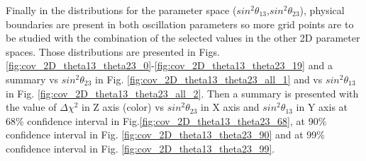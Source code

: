 Finally in the distributions for the parameter space ($sin^{2}\theta_{13}$,$sin^{2}\theta_{23}$),
physical boundaries are present in both oscillation parameters so more grid points are to be studied 
with the combination of the selected values in the other 2D parameter spaces. 
Those distributions are presented in Figs. \ref{fig:cov_2D_theta13_theta23_0}-\ref{fig:cov_2D_theta13_theta23_19}
and a summary vs $sin^{2}\theta_{23}$ in Fig. \ref{fig:cov_2D_theta13_theta23_all_1} and vs  $sin^{2}\theta_{13}$ in Fig. \ref{fig:cov_2D_theta13_theta23_all_2}. Then a summary is presented with the value of $\Delta\chi^{2}$ in Z axis (color) vs $sin^{2}\theta_{23}$ in X axis and $sin^{2}\theta_{13}$ in Y axis at 68\% confidence interval in Fig.\ref{fig:cov_2D_theta13_theta23_68}, at 90\% confidence interval in Fig. \ref{fig:cov_2D_theta13_theta23_90} and at 99\%  confidence interval in Fig. \ref{fig:cov_2D_theta13_theta23_99}.

